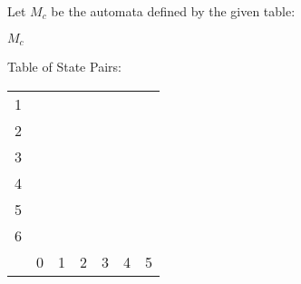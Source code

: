 Let $M_c$ be the automata defined by the given table:
\begin{automata}{$M_c$}
	
	
	
	
	
	
	
	
	
\end{automata}

Table of State Pairs: \\
\begin{center} \begin{tabular}{*{7}{c|}}
									\cline{1-2}
	1 &                       \\	\cline{1-3}
	2 &   &                   \\	\cline{1-4}
	3 &   &   &               \\	\cline{1-5}
	4 &   &   &   &           \\	\cline{1-6}
	5 &   &   &   &   &       \\	\hline
	6 &   &   &   &   &   &   \\	\hline
	  & 0 & 1 & 2 & 3 & 4 & 5 \\	\hline
\end{tabular} \end{center}